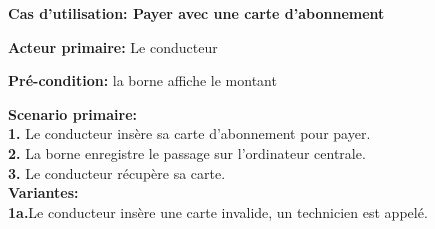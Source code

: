 \textbf{Cas d'utilisation: Payer avec une carte d'abonnement}

\textbf{Acteur primaire:} Le conducteur


\textbf{Pré-condition: }  la borne affiche le montant

 

\textbf{Scenario primaire: } \\
    \textbf{1.} Le conducteur insère sa carte d’abonnement pour payer. \\
    \textbf{2.} La borne enregistre le passage sur l’ordinateur centrale.\\
    \textbf{3.} Le conducteur récupère sa carte.\\

\textbf{Variantes:}\\
    \textbf{1a.}Le conducteur insère une carte invalide, un technicien est appelé.\\
    
